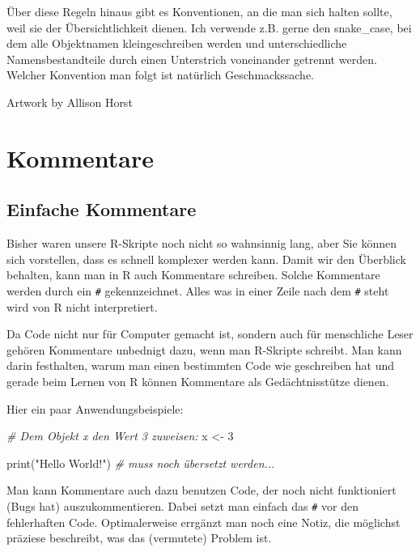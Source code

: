 \documentclass[
]{book}
\newenvironment{Shaded}{\begin{snugshade}}{\end{snugshade}}
\newcommand{\CommentTok}[1]{\textcolor[rgb]{0.56,0.35,0.01}{\textit{#1}}}
\newcommand{\DecValTok}[1]{\textcolor[rgb]{0.00,0.00,0.81}{#1}}
\newcommand{\FunctionTok}[1]{\textcolor[rgb]{0.00,0.00,0.00}{#1}}
\newcommand{\NormalTok}[1]{#1}
\newcommand{\OtherTok}[1]{\textcolor[rgb]{0.56,0.35,0.01}{#1}}
\newcommand{\StringTok}[1]{\textcolor[rgb]{0.31,0.60,0.02}{#1}}
\begin{document}
Über diese Regeln hinaus gibt es Konventionen, an die man sich halten sollte, weil sie der Übersichtlichkeit dienen. Ich verwende z.B. gerne den snake\_case, bei dem alle Objektnamen kleingeschreiben werden und unterschiedliche Namensbestandteile durch einen Unterstrich voneinander getrennt werden. Welcher Konvention man folgt ist natürlich Geschmackssache.

Artwork by Allison Horst

\hypertarget{kommentare}{%
\section{Kommentare}\label{kommentare}}

\hypertarget{einfache-kommentare}{%
\subsection{Einfache Kommentare}\label{einfache-kommentare}}

Bisher waren unsere R-Skripte noch nicht so wahnsinnig lang, aber Sie können sich vorstellen, dass es schnell komplexer werden kann. Damit wir den Überblick behalten, kann man in R auch Kommentare schreiben. Solche Kommentare werden durch ein \texttt{\#} gekennzeichnet. Alles was in einer Zeile nach dem \texttt{\#} steht wird von R nicht interpretiert.

Da Code nicht nur für Computer gemacht ist, sondern auch für menschliche Leser gehören Kommentare unbednigt dazu, wenn man R-Skripte schreibt. Man kann darin festhalten, warum man einen bestimmten Code wie geschreiben hat und gerade beim Lernen von R können Kommentare als Gedächtnisstütze dienen.

Hier ein paar Anwendungsbeispiele:

\begin{Shaded}
\begin{Highlighting}[]
\CommentTok{\# Dem Objekt x den Wert 3 zuweisen:}
\NormalTok{x }\OtherTok{\textless{}{-}} \DecValTok{3}

\FunctionTok{print}\NormalTok{(}\StringTok{"Hello World!"}\NormalTok{) }\CommentTok{\# muss noch übersetzt werden...}
\end{Highlighting}
\end{Shaded}

Man kann Kommentare auch dazu benutzen Code, der noch nicht funktioniert (Bugs hat) auszukommentieren. Dabei setzt man einfach das \texttt{\#} vor den fehlerhaften Code. Optimalerweise errgänzt man noch eine Notiz, die möglichst präziese beschreibt, was das (vermutete) Problem ist.
\end{document}
